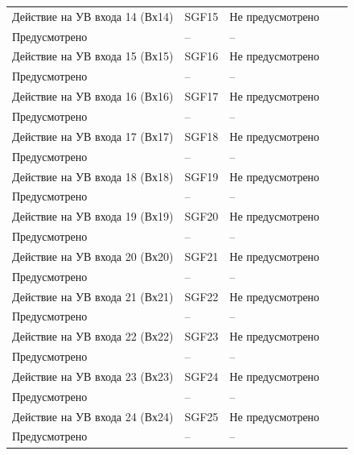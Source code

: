 \begin{longtable}{|>{\centering\arraybackslash}m{5.3cm}|>{\centering\arraybackslash}m{3.3cm}|>{\centering\arraybackslash}m{4.2cm}|>{\centering\arraybackslash}m{1.8cm}|>{\centering\arraybackslash}m{1cm}|}
\hline
\centering Действие на УВ входа 14 (Вх14)  & \centering SGF15 & \centering Не предусмотрено \\ Предусмотрено & \centering -- & \centering \arraybackslash -- \\
\hline
\centering Действие на УВ входа 15 (Вх15)  & \centering SGF16 & \centering Не предусмотрено \\ Предусмотрено & \centering -- & \centering \arraybackslash -- \\
\hline
\centering Действие на УВ входа 16 (Вх16)  & \centering SGF17 & \centering Не предусмотрено \\ Предусмотрено & \centering -- & \centering \arraybackslash -- \\
\hline
\centering Действие на УВ входа 17 (Вх17)  & \centering SGF18 & \centering Не предусмотрено \\ Предусмотрено & \centering -- & \centering \arraybackslash -- \\
\hline
\centering Действие на УВ входа 18 (Вх18)  & \centering SGF19 & \centering Не предусмотрено \\ Предусмотрено & \centering -- & \centering \arraybackslash -- \\
\hline
\centering Действие на УВ входа 19 (Вх19)  & \centering SGF20 & \centering Не предусмотрено \\ Предусмотрено & \centering -- & \centering \arraybackslash -- \\
\hline
\centering Действие на УВ входа 20 (Вх20)  & \centering SGF21 & \centering Не предусмотрено \\ Предусмотрено & \centering -- & \centering \arraybackslash -- \\
\hline
\centering Действие на УВ входа 21 (Вх21)  & \centering SGF22 & \centering Не предусмотрено \\ Предусмотрено & \centering -- & \centering \arraybackslash -- \\
\hline
\centering Действие на УВ входа 22 (Вх22)  & \centering SGF23 & \centering Не предусмотрено \\ Предусмотрено & \centering -- & \centering \arraybackslash -- \\
\hline
\centering Действие на УВ входа 23 (Вх23)  & \centering SGF24 & \centering Не предусмотрено \\ Предусмотрено & \centering -- & \centering \arraybackslash -- \\
\hline
\centering Действие на УВ входа 24 (Вх24)  & \centering SGF25 & \centering Не предусмотрено \\ Предусмотрено & \centering -- & \centering \arraybackslash -- \\

\end{longtable}
